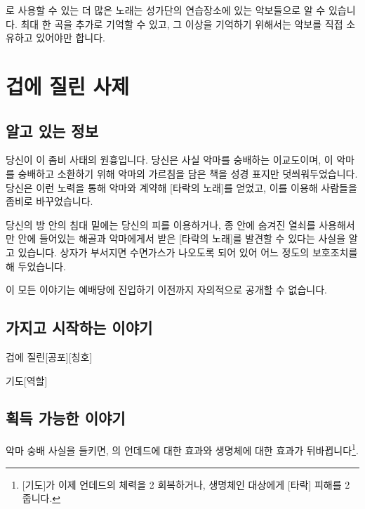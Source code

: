 \documentclass{report}
\begin{document}
			\bigskip
			
			로 사용할 수 있는 더 많은 노래는 성가단의 연습장소에 있는 악보들으로 알 수 있습니다. 최대 한 곡을 추가로 기억할 수 있고, 그 이상을 기억하기 위해서는 악보를 직접 소유하고 있어야만 합니다.
	
	
	
	
	
	\pagebreak
	\section{겁에 질린 사제}
		\subsection*{알고 있는 정보}
			당신이 이 좀비 사태의 원흉입니다. 당신은 사실 악마를 숭배하는 이교도이며, 이 악마를 숭배하고 소환하기 위해 악마의 가르침을 담은 책을 성경 표지만 덧씌워두었습니다. 당신은 이런 노력을 통해 악마와 계약해 [타락의 노래]를 얻었고, 이를 이용해 사람들을 좀비로 바꾸었습니다.
			
			당신의 방 안의 침대 밑에는 당신의 피를 이용하거나, 종 안에 숨겨진 열쇠를 사용해서만 안에 들어있는 해골과 악마에게서 받은 [타락의 노래]를 발견할 수 있다는 사실을 알고 있습니다. 상자가 부서지면 수면가스가 나오도록 되어 있어 어느 정도의 보호조치를 해 두었습니다.
			
			이 모든 이야기는 예배당에 진입하기 이전까지 자의적으로 공개할 수 없습니다.
			
		\subsection*{가지고 시작하는 이야기}
			\begin{spoiler}{겁에 질린}{[공포][칭호]}
				
			\end{spoiler}
			
			\begin{spoiler}{기도}{[역할]}
			\end{spoiler}
		
		\subsection*{획득 가능한 이야기}
			악마 숭배 사실을 들키면, 의 언데드에 대한 효과와 생명체에 대한 효과가 뒤바뀝니다\footnote{[기도]가 이제 언데드의 체력을 2 회복하거나, 생명체인 대상에게 [타락] 피해를 2 줍니다.}.
			
\end{document}

